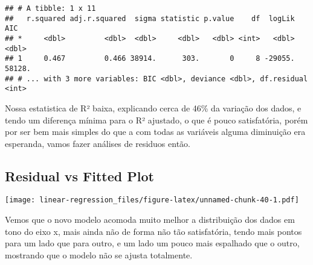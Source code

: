 \documentclass[]{article}
\newenvironment{Shaded}{\begin{snugshade}}{\end{snugshade}}
\newcommand{\KeywordTok}[1]{\textcolor[rgb]{0.13,0.29,0.53}{\textbf{#1}}}
\newcommand{\DataTypeTok}[1]{\textcolor[rgb]{0.13,0.29,0.53}{#1}}
\newcommand{\DecValTok}[1]{\textcolor[rgb]{0.00,0.00,0.81}{#1}}
\newcommand{\StringTok}[1]{\textcolor[rgb]{0.31,0.60,0.02}{#1}}
\newcommand{\OperatorTok}[1]{\textcolor[rgb]{0.81,0.36,0.00}{\textbf{#1}}}
\newcommand{\NormalTok}[1]{#1}
\begin{document}
\begin{verbatim}
## # A tibble: 1 x 11
##   r.squared adj.r.squared  sigma statistic p.value    df  logLik    AIC
## *     <dbl>         <dbl>  <dbl>     <dbl>   <dbl> <int>   <dbl>  <dbl>
## 1     0.467         0.466 38914.      303.       0     8 -29055. 58128.
## # ... with 3 more variables: BIC <dbl>, deviance <dbl>, df.residual <int>
\end{verbatim}

Nossa estatistica de R² baixa, explicando cerca de 46\% da variação dos
dados, e tendo um diferença mínima para o R² ajustado, o que é pouco
satisfatória, porém por ser bem mais simples do que a com todas as
variáveis alguma diminuição era esperanda, vamos fazer análises de
residuos então.

\subsection{Residual vs Fitted Plot}\label{residual-vs-fitted-plot}

\begin{Shaded}
\end{Shaded}

\texttt{[image: linear-regression\_files/figure-latex/unnamed-chunk-40-1.pdf]}

Vemos que o novo modelo acomoda muito melhor a distribuição dos dados em
tono do eixo x, mais ainda não de forma não tão satisfatória, tendo mais
pontos para um lado que para outro, e um lado um pouco mais espalhado
que o outro, mostrando que o modelo não se ajusta totalmente.
\end{document}
